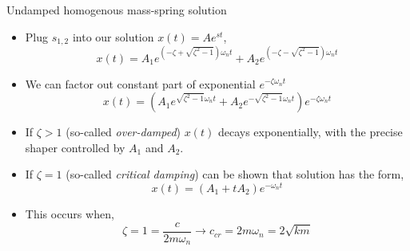\documentclass[11pt,aspectratio=169,handout]{beamer}
\begin{document}
\begin{frame}[c]{Undamped homogenous mass-spring solution}
	\begin{itemize}
		\item<1-> Plug $s_{1,2}$ into our solution $x(t) = Ae^{st} $,
		\begin{equation}
			x(t) = A_1e^{ \left(-\zeta + \sqrt{\zeta^2-1}\right)\omega_n t} + A_2 e^{\left(-\zeta - \sqrt{\zeta^2-1}\right)\omega_n t}
		\end{equation}
	\item<2-> We can factor out constant part of exponential $e^{-\zeta \omega_n t}$
	\begin{equation}
		x(t) = \left(A_1e^{ \sqrt{\zeta^2-1}\omega_n t} + A_2 e^{-\sqrt{\zeta^2-1}\omega_n t}\right)e^{-\zeta\omega_n t}
	\end{equation}
	\item<3-> If $\zeta>1$ (so-called \textit{over-damped}) $x(t)$ decays exponentially, with the precise shaper controlled by $A_1$ and $A_2$.
	\item<4-> If $\zeta=1$ (so-called \textit{critical damping}) can be shown that solution has the form, 
	\begin{equation}
		x(t) = (A_1+tA_2)e^{-\omega_n t}
	\end{equation}
	\item<4-> This occurs when,
	\begin{equation}
		\zeta = 1 = \frac{c}{2m\omega_n} \rightarrow c_{cr} = 2m\omega_n = 2\sqrt{km}
	\end{equation}
	\end{itemize}
\end{frame}
\end{document}
